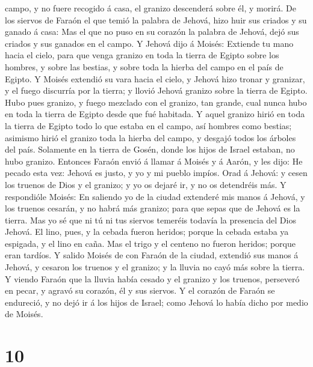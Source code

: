 campo, y no fuere recogido á casa, el granizo descenderá sobre él, y
morirá.  De los siervos de Faraón el que temió la palabra
de Jehová, hizo huir sus criados y su ganado á casa:  Mas
el que no puso en su corazón la palabra de Jehová, dejó sus criados y
sus ganados en el campo.  Y Jehová dijo á Moisés: Extiende
tu mano hacia el cielo, para que venga granizo en toda la tierra de
Egipto sobre los hombres, y sobre las bestias, y sobre toda la hierba
del campo en el país de Egipto.  Y Moisés extendió su vara
hacia el cielo, y Jehová hizo tronar y granizar, y el fuego discurría
por la tierra; y llovió Jehová granizo sobre la tierra de Egipto.
 Hubo pues granizo, y fuego mezclado con el granizo, tan
grande, cual nunca hubo en toda la tierra de Egipto desde que fué
habitada.  Y aquel granizo hirió en toda la tierra de
Egipto todo lo que estaba en el campo, así hombres como bestias;
asimismo hirió el granizo toda la hierba del campo, y desgajó todos los
árboles del país.  Solamente en la tierra de Gosén, donde
los hijos de Israel estaban, no hubo granizo.  Entonces
Faraón envió á llamar á Moisés y á Aarón, y les dijo: He pecado esta
vez: Jehová es justo, y yo y mi pueblo impíos.  Orad á
Jehová: y cesen los truenos de Dios y el granizo; y yo os dejaré ir, y
no os detendréis más.  Y respondióle Moisés: En saliendo yo
de la ciudad extenderé mis manos á Jehová, y los truenos cesarán, y no
habrá más granizo; para que sepas que de Jehová es la tierra.
 Mas yo sé que ni tú ni tus siervos temeréis todavía la
presencia del Dios Jehová.  El lino, pues, y la cebada
fueron heridos; porque la cebada estaba ya espigada, y el lino en caña.
 Mas el trigo y el centeno no fueron heridos; porque eran
tardíos.  Y salido Moisés de con Faraón de la ciudad,
extendió sus manos á Jehová, y cesaron los truenos y el granizo; y la
lluvia no cayó más sobre la tierra.  Y viendo Faraón que la
lluvia había cesado y el granizo y los truenos, perseveró en pecar, y
agravó su corazón, él y sus siervos.  Y el corazón de
Faraón se endureció, y no dejó ir á los hijos de Israel; como Jehová lo
había dicho por medio de Moisés.

\hypertarget{section-9}{%
\section{10}\label{section-9}}

